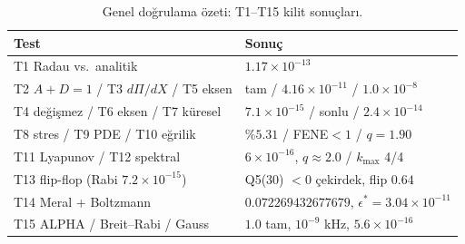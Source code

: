 \documentclass[12pt,a4paper]{article}
\begin{document}
\begin{table}[htbp]
\centering
\footnotesize
\setlength{\tabcolsep}{2pt}
\caption{Genel doğrulama özeti: T1--T15 kilit sonuçları.}
\vspace{0.1cm}
\begin{tabular}{@{}l|l@{}}
\hline
Test & Sonuç \\
\hline
T1 Radau vs.\ analitik & $1.17\times 10^{-13}$ \\
T2 $A+D=1$ / T3 $d\Pi/dX$ / T5 eksen & tam / $4.16\times 10^{-11}$ / $1.0\times 10^{-8}$ \\
T4 değişmez / T6 eksen / T7 küresel & $7.1\times 10^{-15}$ / sonlu / $2.4\times 10^{-14}$ \\
T8 stres / T9 PDE / T10 eğrilik & $\%5.31$ / FENE$<1$ / $q=1.90$ \\
T11 Lyapunov / T12 spektral & $6\times 10^{-16}$, $q\approx2.0$ / $k_{\max}$ 4/4 \\
T13 flip-flop (Rabi $7.2\times 10^{-15}$) & Q5(30) $<0$ çekirdek, flip $0.64$ \\
T14 Meral + Boltzmann & $0.072269432677679$, $\epsilon^*=3.04\times 10^{-11}$ \\
T15 ALPHA / Breit--Rabi / Gauss & $1.0$ tam, $10^{-9}$ kHz, $5.6\times 10^{-16}$ \\
\hline
\end{tabular}
\end{table}
\end{document}
